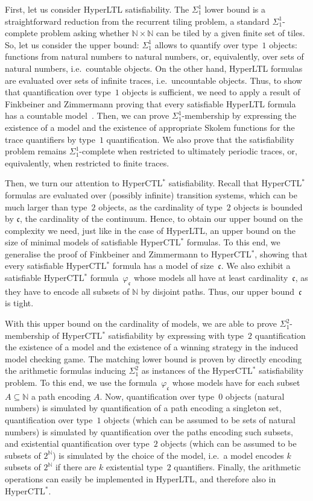 \documentclass[dvipsnames,10pt,a4paper]{amsart}
\theoremstyle{definition}
\theoremstyle{remark}
\newcommand{\contcard}{\cont}
\newcommand{\nats}{\mathbb{N}}
\newcommand{\pow}[1]{2^{#1}}
\newcommand{\cont}{\mathfrak{c}}
\newcommand{\hyltl}{{HyperLTL}\xspace}
\newcommand{\hyctlstar}{{HyperCTL$^*$}\xspace}
\begin{document}
First, let us consider \hyltl satisfiability.
The $\Sigma_1^1$ lower bound is a straightforward reduction from the recurrent tiling problem, a standard $\Sigma_1^1$-complete problem asking whether $\nats\times\nats$ can be tiled by a given finite set of tiles.
So, let us consider the upper bound: $\Sigma_1^1$ allows to quantify over type~$1$ objects: functions from natural numbers to natural numbers, or, equivalently, over sets of natural numbers, i.e.\ countable objects.
On the other hand, \hyltl formulas are evaluated over sets of infinite traces, i.e.\ uncountable objects. 
Thus, to show that quantification over type~$1$ objects is sufficient, we need to apply a result of Finkbeiner and Zimmermann proving that every satisfiable \hyltl formula has a countable model~\cite{FZ17}.
Then, we can prove $\Sigma_1^1$-membership by expressing the existence of a model and the existence of appropriate Skolem functions for the trace quantifiers by type~$1$ quantification. 
We also prove that the satisfiability problem remains $\Sigma_1^1$-complete when restricted to ultimately periodic traces, or, equivalently, when restricted to finite traces.

Then, we turn our attention to \hyctlstar satisfiability.
Recall that \hyctlstar formulas are evaluated over (possibly infinite) transition systems, which can be much larger than type~$2$ objects, as the cardinality of type~$2$ objects is bounded by $\contcard$, the cardinality of the continuum.
Hence, to obtain our upper bound on the complexity we need, just like in the case of \hyltl, an upper bound on the size of minimal models of satisfiable \hyctlstar formulas.
To this end, we generalise the proof of Finkbeiner and Zimmermann to \hyctlstar, showing that every satisfiable \hyctlstar formula has a model of size~$\contcard$. 
We also exhibit a satisfiable \hyctlstar formula~$\varphi_\contcard$ whose models all have at least cardinality~$\contcard$, as they have to encode all subsets of $\nats$ by disjoint paths.
Thus, our upper bound~$\contcard$ is tight.

With this upper bound on the cardinality of models, we are able to prove $\Sigma_1^2$-membership of \hyctlstar satisfiability by expressing with type~$2$ quantification the existence of a model and the existence of a winning strategy in the induced model checking game.
The matching lower bound is proven by directly encoding the arithmetic formulas inducing $\Sigma_1^2$ as instances of the \hyctlstar satisfiability problem.
To this end, we use the formula~$\varphi_\contcard$ whose models have for each subset $A \subseteq \nats$ a path encoding $A$.
Now, quantification over type~$0$ objects (natural numbers) is simulated by quantification of a path encoding a singleton set, quantification over type~$1$ objects (which can be assumed to be sets of natural numbers) is simulated by quantification over the paths encoding such subsets, and existential quantification over type~$2$ objects (which can be assumed to be subsets of $\pow{\nats}$) is simulated by the choice of the model, i.e.\ a model encodes $k$ subsets of $\pow{\nats}$ if there are $k$ existential type~$2$ quantifiers.
Finally, the arithmetic operations can easily be implemented in \hyltl, and therefore also in \hyctlstar.
\end{document}
